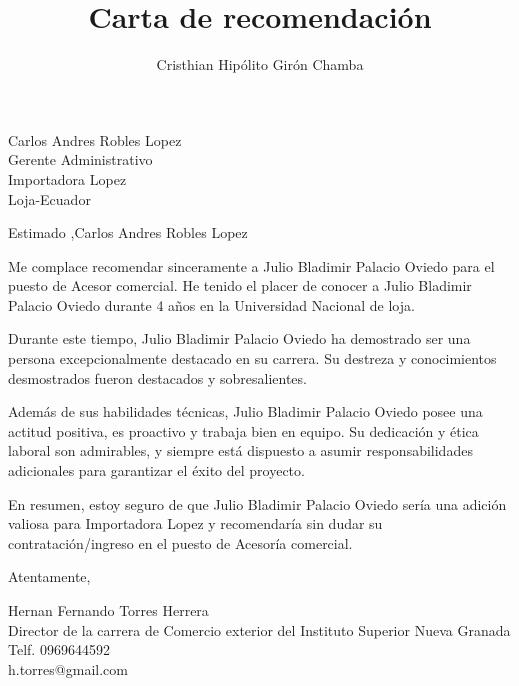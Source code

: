 \documentclass{letter}
\begin{document}
\title{Carta de recomendación}
\author{Cristhian Hipólito Girón Chamba}


\begin{letter}{Carlos Andres Robles Lopez \\ Gerente Administrativo \\ Importadora Lopez \\ Loja-Ecuador}

    \opening{Estimado ,Carlos Andres Robles Lopez}

    Me complace recomendar sinceramente a Julio Bladimir Palacio Oviedo para el puesto de Acesor comercial. He tenido el placer de conocer a Julio Bladimir Palacio Oviedo durante 4 años en la Universidad Nacional de loja.

    Durante este tiempo, Julio Bladimir Palacio Oviedo ha demostrado ser una persona excepcionalmente destacado en su carrera. Su destreza y conocimientos desmostrados fueron destacados y sobresalientes.

    Además de sus habilidades técnicas, Julio Bladimir Palacio Oviedo posee una actitud positiva, es proactivo y trabaja bien en equipo. Su dedicación y ética laboral son admirables, y siempre está dispuesto a asumir responsabilidades adicionales para garantizar el éxito del proyecto.

    En resumen, estoy seguro de que Julio Bladimir Palacio Oviedo sería una adición valiosa para Importadora Lopez y recomendaría sin dudar su contratación/ingreso en el puesto de Acesoría comercial.

    \closing{Atentamente,}

    Hernan Fernando Torres Herrera \\
    Director de la carrera de Comercio exterior del Instituto Superior Nueva Granada \\
    Telf. 0969644592 \\
    h.torres@gmail.com

\end{letter}
\end{document}
